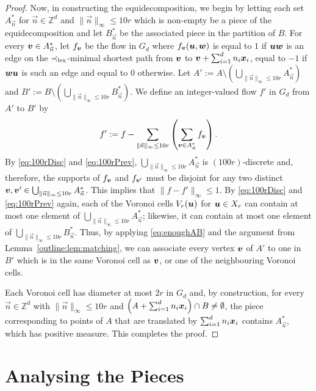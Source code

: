 \documentclass[12pt,a4paper]{amsart}
\numberwithin{equation}{section}
\theoremstyle{definition}
\begin{document}
\begin{proof}
Now, in constructing the equidecomposition, we begin by letting each set $A^*_{\vec{n}}$ for $\vec{n}\in\mathbb{Z}^d$ and $\|\vec{n}\|_\infty\leq 10r$ which is non-empty be a piece of the equidecomposition and let $B^*_{\vec{n}}$ be the associated piece in the partition of $B$. For every $\boldsymbol{v}\in A^*_{\vec{n}}$, let $f_{\boldsymbol{v}}$ be the flow in $G_d$ where $f_{\boldsymbol{v}}(\boldsymbol{u},\boldsymbol{w})$  is equal to $1$ if $\boldsymbol{u}\boldsymbol{w}$ is an edge on the $\prec_{\operatorname{lex}}$-minimal shortest path from $\boldsymbol{v}$ to $\boldsymbol{v}+\sum_{i=1}^dn_i\boldsymbol{x}_i$, equal to $-1$ if $\boldsymbol{w}\boldsymbol{u}$ is such an edge and equal to $0$ otherwise. Let $A':=A\setminus \left(\bigcup_{\|\vec{n}\|_\infty\leq 10r}A_{\vec{n}}^*\right)$ and $B':=B\setminus \left(\bigcup_{\|\vec{n}\|_\infty\leq 10r}B_{\vec{n}}^*\right)$. We define an integer-valued flow $f'$ in $G_d$ from $A'$ to $B'$ by
\begin{equation}
\label{eq:f'def}
f':=f - \sum_{\|\vec{n}\|_\infty\leq 10r}\left(\sum_{\boldsymbol{v}\in A^*_{\vec{n}}}f_{\boldsymbol{v}}\right).\end{equation}
By \eqref{eq:100rDisc} and \eqref{eq:100rPrev}, $\bigcup_{\|\vec{n}\|_\infty\leq 10r}A_{\vec{n}}^*$ is $(100r)$-discrete and, therefore, the supports of $f_{\boldsymbol{v}}$ and $f_{\boldsymbol{v}'}$ must be disjoint for any two distinct $\boldsymbol{v},\boldsymbol{v}'\in\bigcup_{\|\vec{n}\|_\infty\leq 10r}A_{\vec{n}}^*$. This implies that $\|f-f'\|_\infty\leq 1$. By \eqref{eq:100rDisc} and \eqref{eq:100rPrev} again, each of the Voronoi cells $V_r(\boldsymbol{u})$ for $\boldsymbol{u}\in X_r$ can contain at most one element of $\bigcup_{\|\vec{n}\|_\infty\leq 10r}A_{\vec{n}}^*$; likewise, it can contain at most one element of $\bigcup_{\|\vec{n}\|_\infty\leq 10r}B_{\vec{n}}^*$. Thus, by applying \eqref{eq:enoughAB} and the argument from Lemma~\ref{outline:lem:matching}, we can associate every vertex $\boldsymbol{v}$ of $A'$ to one in $B'$ which is in the same Voronoi cell as $\boldsymbol{v}$, or one of the neighbouring Voronoi cells. 

Each Voronoi cell has diameter at most $2r$ in $G_d$ and, by construction, for every $\vec{n}\in\mathbb{Z}^d$ with $\|\vec{n}\|_\infty\leq 10r$ and $\left(A+\sum_{i=1}^dn_i\boldsymbol{x}_i\right)\cap B\neq \emptyset$, the piece corresponding to points of $A$ that are translated by $\sum_{i=1}^dn_i\boldsymbol{x}_i$ contains $A_{\vec{n}}^*$, which has positive measure. This completes the proof. 
\end{proof}


\section{Analysing the Pieces}
\label{sec:pieces}
\end{document}
